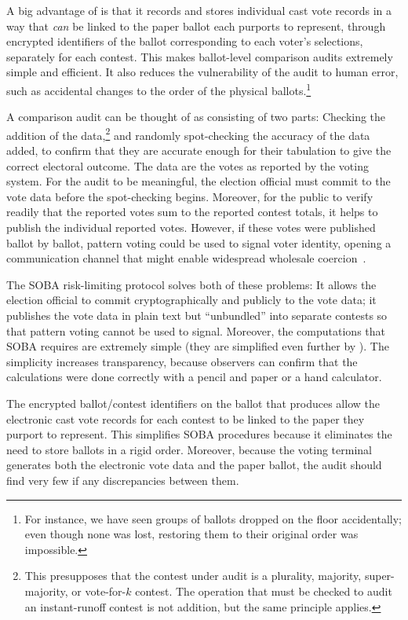 A big advantage of \projname is that it records and stores individual cast vote records in a way that 
{\em can\/} be linked to
the paper ballot each purports to represent, through encrypted identifiers
of the ballot corresponding to each voter's selections, separately for each contest.
This makes ballot-level comparison audits extremely simple and efficient.
It also reduces the vulnerability of the audit to human error, such as accidental changes to the order
of the physical ballots.\footnote{%
   For instance, we have seen groups of ballots dropped on the floor accidentally;
   even though none was lost, restoring them to their original order was impossible.
}

A comparison audit can be thought of as consisting of two parts:
Checking the addition of the data,\footnote{%
   This presupposes that the contest under audit is a plurality, majority, super-majority, or vote-for-$k$
   contest.
   The operation that must be checked to audit an instant-runoff contest is not addition, but the
   same principle applies.
}
and randomly spot-checking the accuracy of the data added, to confirm that they are accurate
enough for their tabulation to give the correct electoral outcome.
The data are the votes as reported by the voting system.
For the audit to be meaningful, the election official must commit to the vote data before the
spot-checking begins.
Moreover, for the public to verify readily that the reported votes sum to the reported contest totals,
it helps to publish the individual reported votes.
However, if these votes were published ballot by ballot, pattern voting could be used to signal voter identity,
opening a communication channel that might enable 
widespread wholesale coercion~\cite{rescorla09,benalohEtal11}.

The SOBA risk-limiting protocol \cite{benalohEtal11} solves both of these problems:
It allows the election official to commit cryptographically and publicly to the vote data; it publishes
the vote data in plain text but ``unbundled'' into separate contests so that pattern voting cannot
be used to signal.
Moreover, the computations that SOBA requires are extremely simple (they are simplified
even further by \cite{lindemanStark12}).
The simplicity increases transparency, because observers can confirm that the calculations
were done correctly with a pencil and paper or a hand calculator.

The encrypted ballot/contest identifiers on the ballot that \projname produces 
allow the electronic cast vote records for each contest to be linked to
the paper they purport to represent.
This simplifies SOBA procedures because it eliminates the need to store ballots in a rigid order.
Moreover, because the voting terminal generates both the electronic vote data and the paper ballot, 
the audit should find very few if any discrepancies between them.

